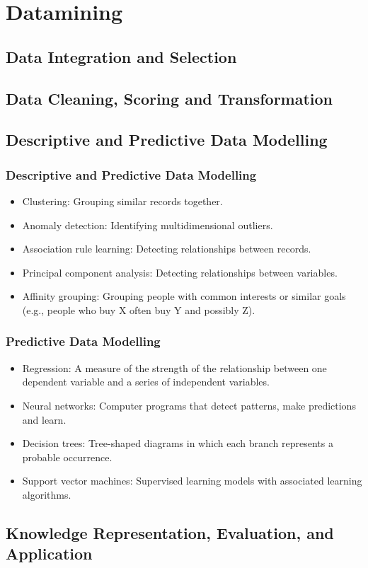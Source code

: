 \section{Datamining}
\subsection{Data Integration and Selection}
\subsection{Data Cleaning, Scoring and Transformation}
\subsection{Descriptive and Predictive Data Modelling}

\begin{frame}
\frametitle{Descriptive and Predictive Data Modelling}
\begin{itemize}
    \item Clustering: Grouping similar records together.
    \item Anomaly detection: Identifying multidimensional outliers.
    \item Association rule learning: Detecting relationships between records.
    \item Principal component analysis:  Detecting relationships between variables.
    \item Affinity grouping: Grouping people with common interests or similar goals (e.g., people who buy X often buy Y and possibly Z).
\end{itemize}
\end{frame}

\begin{frame}
\frametitle{Predictive Data Modelling}
\begin{itemize}
\item Regression:
A measure of the strength of the relationship between one dependent variable and a series of independent variables.
\item Neural networks: Computer programs that detect patterns, make predictions and learn.
\item Decision trees: Tree-shaped diagrams in which each branch represents a probable occurrence.
\item Support vector machines: Supervised learning models with associated learning algorithms.
\end{itemize}
\end{frame}

\subsection{Knowledge Representation, Evaluation, and Application}
\endinput
